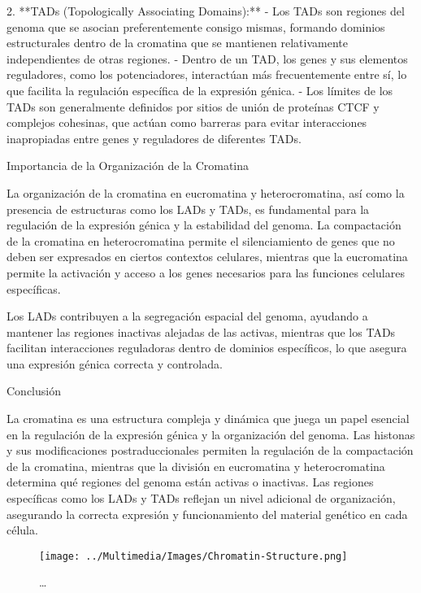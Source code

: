 2. **TADs (Topologically Associating Domains):**
- Los TADs son regiones del genoma que se asocian preferentemente consigo mismas, formando dominios estructurales dentro de la cromatina que se mantienen relativamente independientes de otras regiones.
- Dentro de un TAD, los genes y sus elementos reguladores, como los potenciadores, interactúan más frecuentemente entre sí, lo que facilita la regulación específica de la expresión génica.
- Los límites de los TADs son generalmente definidos por sitios de unión de proteínas CTCF y complejos cohesinas, que actúan como barreras para evitar interacciones inapropiadas entre genes y reguladores de diferentes TADs.

Importancia de la Organización de la Cromatina

La organización de la cromatina en eucromatina y heterocromatina, así como la presencia de estructuras como los LADs y TADs, es fundamental para la regulación de la expresión génica y la estabilidad del genoma. La compactación de la cromatina en heterocromatina permite el silenciamiento de genes que no deben ser expresados en ciertos contextos celulares, mientras que la eucromatina permite la activación y acceso a los genes necesarios para las funciones celulares específicas.

Los LADs contribuyen a la segregación espacial del genoma, ayudando a mantener las regiones inactivas alejadas de las activas, mientras que los TADs facilitan interacciones reguladoras dentro de dominios específicos, lo que asegura una expresión génica correcta y controlada.

Conclusión

La cromatina es una estructura compleja y dinámica que juega un papel esencial en la regulación de la expresión génica y la organización del genoma. Las histonas y sus modificaciones postraduccionales permiten la regulación de la compactación de la cromatina, mientras que la división en eucromatina y heterocromatina determina qué regiones del genoma están activas o inactivas. Las regiones específicas como los LADs y TADs reflejan un nivel adicional de organización, asegurando la correcta expresión y funcionamiento del material genético en cada célula.

\begin{figure}
    \centering
    \texttt{[image: ../Multimedia/Images/Chromatin-Structure.png]}
    \caption{\dots \cite{Misteli2020}}
    \label{fig:chromatin-structure}
\end{figure}

